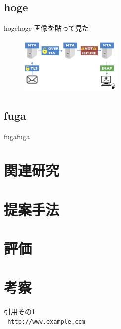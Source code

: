 \documentclass[a4j,10pt]{jsarticle}
\begin{document}
\subsection{hoge}
hogehoge
画像を貼って見た

\begin{figure}[htbp]
    \includegraphics[width=5cm]{figure1.png}
    \caption{}
\end{figure}
 
\subsection{fuga}
fugafuga

\section{関連研究}

\section{提案手法}

\section{評価}

\section{考察}

\begin{thebibliography}{99}
引用その1\\
\texttt{ http://www.example.com}
\end{thebibliography}
\end{document}
